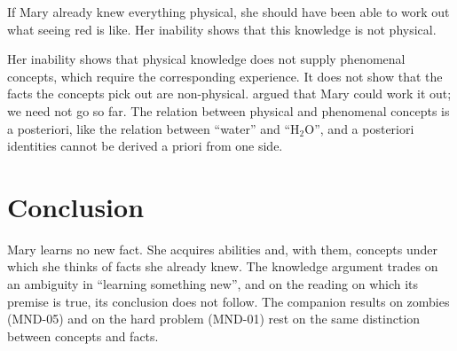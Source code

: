 \documentclass{situationist-preprint}
\begin{document}
\begin{objection}
If Mary already knew everything physical, she should have been able to work out what seeing red is like. Her inability shows that this knowledge is not physical.
\end{objection}

\begin{reply}
Her inability shows that physical knowledge does not supply phenomenal concepts, which require the corresponding experience. It does not show that the facts the concepts pick out are non-physical. \citet{Dennett1991} argued that Mary could work it out; we need not go so far. The relation between physical and phenomenal concepts is a posteriori, like the relation between \enquote{water} and \enquote{H$_2$O}, and a posteriori identities cannot be derived a priori from one side.
\end{reply}

\section{Conclusion}

Mary learns no new fact. She acquires abilities and, with them, concepts under which she thinks of facts she already knew. The knowledge argument trades on an ambiguity in \enquote{learning something new}, and on the reading on which its premise is true, its conclusion does not follow. The companion results on zombies (MND-05) and on the hard problem (MND-01) rest on the same distinction between concepts and facts.
\end{document}
